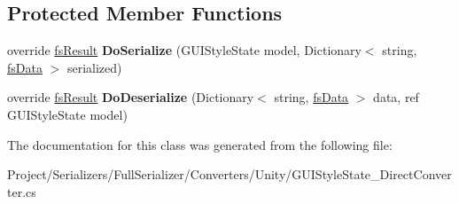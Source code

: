 \subsection*{Protected Member Functions}
\begin{DoxyCompactItemize}
\item 
\mbox{\label{class_full_serializer_1_1_internal_1_1_direct_converters_1_1_g_u_i_style_state___direct_converter_a22918e9d8716303f0d7c311ded59182a}} 
override \hyperlink{struct_full_serializer_1_1fs_result}{fs\+Result} {\bfseries Do\+Serialize} (G\+U\+I\+Style\+State model, Dictionary$<$ string, \hyperlink{class_full_serializer_1_1fs_data}{fs\+Data} $>$ serialized)
\item 
\mbox{\label{class_full_serializer_1_1_internal_1_1_direct_converters_1_1_g_u_i_style_state___direct_converter_a566d302ecb008a55fab674178d8a52bb}} 
override \hyperlink{struct_full_serializer_1_1fs_result}{fs\+Result} {\bfseries Do\+Deserialize} (Dictionary$<$ string, \hyperlink{class_full_serializer_1_1fs_data}{fs\+Data} $>$ data, ref G\+U\+I\+Style\+State model)
\end{DoxyCompactItemize}


The documentation for this class was generated from the following file\+:\begin{DoxyCompactItemize}
\item 
Project/\+Serializers/\+Full\+Serializer/\+Converters/\+Unity/G\+U\+I\+Style\+State\+\_\+\+Direct\+Converter.\+cs\end{DoxyCompactItemize}
